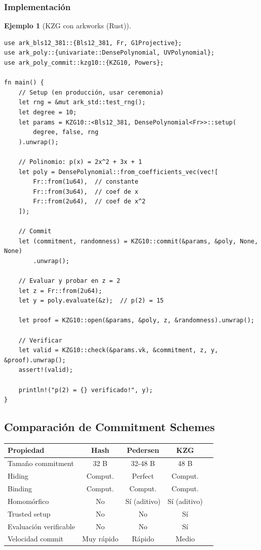 \documentclass[11pt,a4paper,twoside,openright]{book}
\theoremstyle{definition}
\newtheorem{example}{Ejemplo}[chapter]
\theoremstyle{plain}
\theoremstyle{remark}
\begin{document}
\subsubsection{Implementación}

\begin{example}[KZG con arkworks (Rust)]
\begin{verbatim}
use ark_bls12_381::{Bls12_381, Fr, G1Projective};
use ark_poly::{univariate::DensePolynomial, UVPolynomial};
use ark_poly_commit::kzg10::{KZG10, Powers};

fn main() {
    // Setup (en producción, usar ceremonia)
    let rng = &mut ark_std::test_rng();
    let degree = 10;
    let params = KZG10::<Bls12_381, DensePolynomial<Fr>>::setup(
        degree, false, rng
    ).unwrap();
    
    // Polinomio: p(x) = 2x^2 + 3x + 1
    let poly = DensePolynomial::from_coefficients_vec(vec![
        Fr::from(1u64),  // constante
        Fr::from(3u64),  // coef de x
        Fr::from(2u64),  // coef de x^2
    ]);
    
    // Commit
    let (commitment, randomness) = KZG10::commit(&params, &poly, None, None)
        .unwrap();
    
    // Evaluar y probar en z = 2
    let z = Fr::from(2u64);
    let y = poly.evaluate(&z);  // p(2) = 15
    
    let proof = KZG10::open(&params, &poly, z, &randomness).unwrap();
    
    // Verificar
    let valid = KZG10::check(&params.vk, &commitment, z, y, &proof).unwrap();
    assert!(valid);
    
    println!("p(2) = {} verificado!", y);
}
\end{verbatim}
\end{example}

\subsection{Comparación de Commitment Schemes}

\begin{center}
\begin{tabular}{lcccc}
\toprule
\textbf{Propiedad} & \textbf{Hash} & \textbf{Pedersen} & \textbf{KZG} \\
\midrule
Tamaño commitment & 32 B & 32-48 B & 48 B \\
Hiding & Comput. & Perfect & Comput. \\
Binding & Comput. & Comput. & Comput. \\
Homomórfico & No & Sí (aditivo) & Sí (aditivo) \\
Trusted setup & No & No & Sí \\
Evaluación verificable & No & No & Sí \\
Velocidad commit & Muy rápido & Rápido & Medio \\
\bottomrule
\end{tabular}
\end{center}
\end{document}
